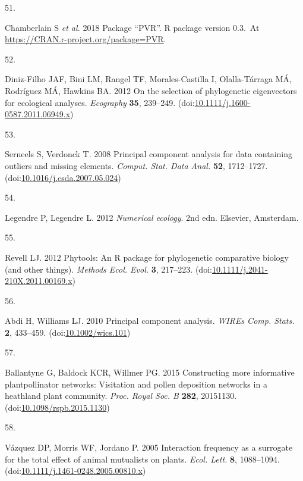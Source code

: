 \documentclass[
  12pt,
  a4paper,
]{article}
\newlength{\cslhangindent}
\newlength{\csllabelwidth}
\newlength{\cslentryspacingunit} %
\newenvironment{CSLReferences}[2] %
 {%
  \setlength{\parindent}{0pt}
  \ifodd #1
  \let\oldpar\par
  \def\par{\hangindent=\cslhangindent\oldpar}
  \fi
  \setlength{\parskip}{#2\cslentryspacingunit}
 }%
 {}
\newcommand{\CSLLeftMargin}[1]{\parbox[t]{\csllabelwidth}{#1}}
\newcommand{\CSLRightInline}[1]{\parbox[t]{\linewidth - \csllabelwidth}{#1}\break}
\begin{document}
\begin{CSLReferences}{0}{0}
\leavevmode{}%
\CSLLeftMargin{51. }
\CSLRightInline{Chamberlain S \emph{et al.} 2018 Package {``{PVR}''}. R package version 0.3.~At \href{https://CRAN.R-project.org/package=PVR}{https://CRAN.r-project.org/package=PVR}. }

\leavevmode{}%
\CSLLeftMargin{52. }
\CSLRightInline{Diniz-Filho JAF, Bini LM, Rangel TF, Morales-Castilla I, Olalla-Tárraga MÁ, Rodríguez MÁ, Hawkins BA. 2012 On the selection of phylogenetic eigenvectors for ecological analyses. \emph{Ecography} \textbf{35}, 239--249. (doi:\href{https://doi.org/10.1111/j.1600-0587.2011.06949.x}{10.1111/j.1600-0587.2011.06949.x})}

\leavevmode{}%
\CSLLeftMargin{53. }
\CSLRightInline{Serneels S, Verdonck T. 2008 Principal component analysis for data containing outliers and missing elements. \emph{Comput. Stat. Data Anal.} \textbf{52}, 1712--1727. (doi:\href{https://doi.org/10.1016/j.csda.2007.05.024}{10.1016/j.csda.2007.05.024})}

\leavevmode{}%
\CSLLeftMargin{54. }
\CSLRightInline{Legendre P, Legendre L. 2012 \emph{Numerical ecology}. {2nd edn}. {Elsevier, Amsterdam}. }

\leavevmode{}%
\CSLLeftMargin{55. }
\CSLRightInline{Revell LJ. 2012 Phytools: An {R} package for phylogenetic comparative biology (and other things). \emph{Methods Ecol. Evol.} \textbf{3}, 217--223. (doi:\href{https://doi.org/10.1111/j.2041-210X.2011.00169.x}{10.1111/j.2041-210X.2011.00169.x})}

\leavevmode{}%
\CSLLeftMargin{56. }
\CSLRightInline{Abdi H, Williams LJ. 2010 Principal component analysis. \emph{WIREs Comp. Stats.} \textbf{2}, 433--459. (doi:\href{https://doi.org/10.1002/wics.101}{10.1002/wics.101})}

\leavevmode{}%
\CSLLeftMargin{57. }
\CSLRightInline{Ballantyne G, Baldock KCR, Willmer PG. 2015 Constructing more informative plant\textendash pollinator networks: Visitation and pollen deposition networks in a heathland plant community. \emph{Proc. Royal Soc. B} \textbf{282}, 20151130. (doi:\href{https://doi.org/10.1098/rspb.2015.1130}{10.1098/rspb.2015.1130})}

\leavevmode{}%
\CSLLeftMargin{58. }
\CSLRightInline{Vázquez DP, Morris WF, Jordano P. 2005 Interaction frequency as a surrogate for the total effect of animal mutualists on plants. \emph{Ecol. Lett.} \textbf{8}, 1088--1094. (doi:\href{https://doi.org/10.1111/j.1461-0248.2005.00810.x}{10.1111/j.1461-0248.2005.00810.x})}


\end{CSLReferences}
\end{document}
